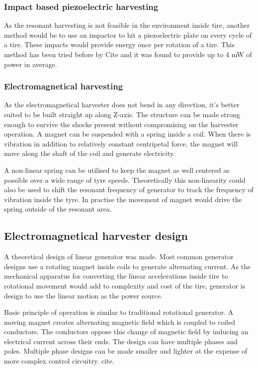 \subsubsection{Impact based piezoelectric harvesting}
As the resonant harvesting is not feasible in the environment inside tire, another method would be to use an impactor to hit a piezoelectric plate on every cycle of a tire. These impacts would provide energy once per rotation of a tire. This method has been tried before by {\color{red} Cite} and it was found to provide up to 4 mW of power in average. 

\subsubsection{Electromagnetical harvesting}
As the electromagnetical harvester does not bend in any direction, it's better suited to be built straight up along Z-axis. The structure can be made strong enough to survive the shocks present without compromising on the harvester operation. A magnet can be suspended with a spring inside a coil. When there is vibration in addition to relatively constant centripetal force, the magnet will move along the shaft of the coil and generate electricity.

A non-linear spring can be utilised to keep the magnet as well centered as possible over a wide range of tyre speeds. Theoretically this non-linearity could also be used to shift the resonant frequency of generator to track the frequency of vibration inside the tyre. In practise the movement of magnet would drive the spring outside of the resonant area. 

\subsection{Electromagnetical harvester design}
A theoretical design of linear generator was made. Most common generator designs use a rotating magnet inside coils to generate alternating current. As the mechanical apparatus for converting the linear accelerations inside tire to rotational movement would add to complexity and cost of the tire, generator is design to use the linear motion as the power source.

Basic principle of operation is similar to traditional rotational generator. A moving magnet creates alternating magnetic field which is coupled to coiled conductors. The conductors oppose this change of magnetic field by inducing an electrical current across their ends. The design can have multiple phases and poles. Multiple phase designs can be made smaller and lighter at the expense of more complex control circuitry. {\color{red} cite}. 

